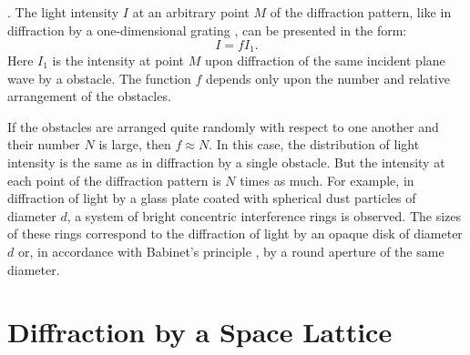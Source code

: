 \subsection{}\label{33.3.10}  . The light intensity $I$ at an
arbitrary point $M$ of the diffraction pattern, like in diffraction by a one-dimensional grating , can be presented in the form: 
\begin{equation*}%
I = f I_{1}. 
\end{equation*}
Here $I_{1}$ is the intensity at point $M$ upon diffraction
of the same incident plane wave by a  obstacle. The function $f$ depends only upon the number and relative arrangement of the obstacles.

If the obstacles are arranged quite randomly with respect to one another and their number $N$ is large, then $f \approx N$. In this case, the distribution of light intensity is the same as in diffraction by a single obstacle. But the intensity at each point of the diffraction pattern is $N$ times as much. For example, in diffraction of light by a glass plate coated with spherical dust particles of diameter $d$, a system of bright concentric interference rings is observed. The sizes of these rings correspond to the diffraction of light by an opaque disk of diameter $d$ or, in accordance with Babinet's principle , by a round aperture of the same diameter.

\section{Diffraction by a Space Lattice}
\label{sec-33.4} 


